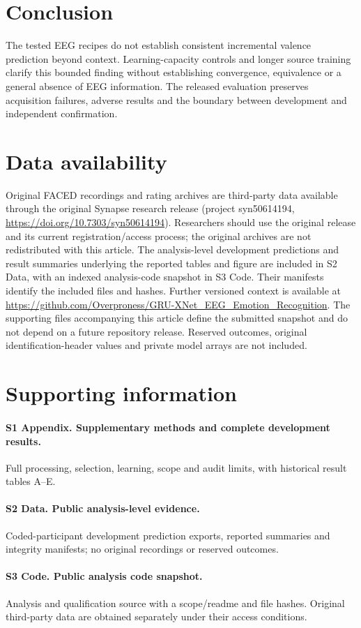 \documentclass[10pt,letterpaper]{article}
\begin{document}
\section{Conclusion}
The tested EEG recipes do not establish consistent incremental valence prediction beyond context. Learning-capacity controls and longer source training clarify this bounded finding without establishing convergence, equivalence or a general absence of EEG information. The released evaluation preserves acquisition failures, adverse results and the boundary between development and independent confirmation.


\section*{Data availability}
Original FACED recordings and rating archives are third-party data available through the original Synapse research release (project syn50614194, \url{https://doi.org/10.7303/syn50614194}). Researchers should use the original release and its current registration/access process; the original archives are not redistributed with this article. The analysis-level development predictions and result summaries underlying the reported tables and figure are included in S2 Data, with an indexed analysis-code snapshot in S3 Code. Their manifests identify the included files and hashes. Further versioned context is available at \url{https://github.com/Overproness/GRU-XNet_EEG_Emotion_Recognition}. The supporting files accompanying this article define the submitted snapshot and do not depend on a future repository release. Reserved outcomes, original identification-header values and private model arrays are not included.


\section*{Supporting information}
\begingroup{}
\paragraph{S1 Appendix. Supplementary methods and complete development results.}
Full processing, selection, learning, scope and audit limits, with historical result tables A--E.
\paragraph{S2 Data. Public analysis-level evidence.}
Coded-participant development prediction exports, reported summaries and integrity manifests; no original recordings or reserved outcomes.
\paragraph{S3 Code. Public analysis code snapshot.}
Analysis and qualification source with a scope/readme and file hashes. Original third-party data are obtained separately under their access conditions.
\endgroup
\end{document}
